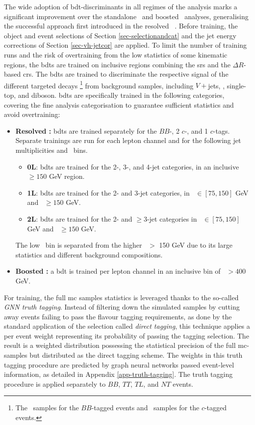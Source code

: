 The wide adoption of \gls{bdt}-discriminants in all regimes of the analysis marks a significant improvement over the standalone \vhc\ and boosted \vhb\ analyses, generalising the successful approach first introduced in the resolved \vhb\ \cite{ATLAS:2020fcp}. Before training, the object and event selections of Section \ref{sec-selectionandcat} and the jet energy corrections of Section \ref{sec-vh-jetcor} are applied. To limit the number of training runs and the risk of overtraining from the low statistics of some kinematic regions, the \glspl{bdt} are trained on inclusive regions combining the \glspl{sr} and the $\Delta R$-based \glspl{cr}. The \glspl{bdt} are trained to discriminate the respective signal of the different targeted decays \footnote{The \vhb\ samples for the $BB$-tagged events and \vhc\ samples for the $c$-tagged events.} from background samples, including $V+$jets, \ttb, single-top, and diboson. \glspl{bdt} are specifically trained in the following categories, covering the fine analysis categorisation to guarantee sufficient statistics and avoid overtraining:
\begin{itemize}[leftmargin=*]
  \item \textbf{Resolved \boldvhbc:} \glspl{bdt} are trained separately for the $BB$-, 2 $c$-, and 1 $c$-tags. Separate trainings are run for each lepton channel and for the following jet multiplicities and \ptv\ bins.
  \begin{itemize}
      \item \textbf{0L}: \glspl{bdt} are trained for the 2-, 3-, and 4-jet categories, in an inclusive \ptv\ $\geq 150$ GeV region.
      \item \textbf{1L}: \glspl{bdt} are trained for the 2- and 3-jet categories, in \ptv\ $\in [75, 150]$ GeV and \ptv\ $\geq 150$ GeV.
      \item \textbf{2L}: \glspl{bdt} are trained for the 2- and $\geq$3-jet categories in \ptv\ $\in [75, 150]$ GeV and \ptv\ $\geq 150$ GeV.
  \end{itemize}
  The low \ptv\ bin is separated from the higher \ptv\ $>$ 150 GeV due to its large statistics and different background compositions.
  \item \textbf{Boosted \boldvhbc:} a \gls{bdt} is trained per lepton channel in an inclusive bin of \ptv\ $>400$ GeV.
\end{itemize}

For training, the full \gls{mc} samples statistics is leveraged thanks to the so-called \textit{GNN truth tagging}. Instead of filtering down the simulated samples by cutting away events failing to pass the flavour tagging requirements, as done by the standard application of the selection called \textit{direct tagging}, this technique applies a per event weight representing its probability of passing the tagging selection. The result is a weighted distribution possessing the statistical precision of the full \gls{mc}-samples but distributed as the direct tagging scheme. The weights in this truth tagging procedure are predicted by graph neural networks passed event-level information, as detailed in Appendix \ref{app-truth-tagging}. The truth tagging procedure is applied separately to $BB$, $TT$, $TL$, and $NT$ events. \\

